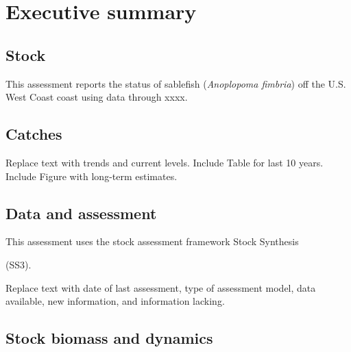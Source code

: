 \documentclass[11pt,
  letterpaper,
]{article}
\begin{document}
\newcommand{\lt}{\ensuremath <}
\newcommand{\gt}{\ensuremath >}

\pagebreak
{}
\setcounter{page}{1}

\renewcommand{\thetable}{\roman{table}}
\renewcommand{\thefigure}{\roman{figure}}

\setlength\parskip{0.5em plus 0.1em minus 0.2em}

\hypertarget{executive-summary}{%
\section*{Executive summary}\label{executive-summary}}

\hypertarget{stock}{%
\subsection*{Stock}\label{stock}}

This assessment reports the status of sablefish (\emph{Anoplopoma fimbria}) off the U.S. West Coast coast using data through xxxx.

\hypertarget{catches}{%
\subsection*{Catches}\label{catches}}

Replace text with trends and current levels. Include Table for last 10 years. Include Figure with long-term estimates.

\hypertarget{data-and-assessment}{%
\subsection*{Data and assessment}\label{data-and-assessment}}

This assessment uses the stock assessment framework Stock Synthesis

(SS3).

Replace text with date of last assessment, type of assessment model, data available, new information, and information lacking.

\hypertarget{stock-biomass-and-dynamics}{%
\subsection*{Stock biomass and dynamics}\label{stock-biomass-and-dynamics}}
\end{document}
